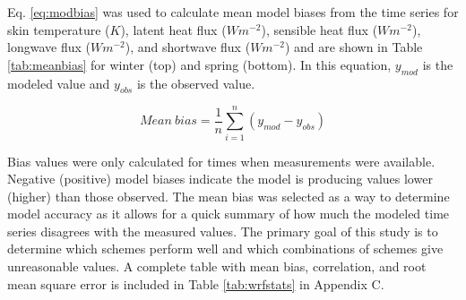 Eq. \ref{eq:modbias} was used to calculate mean model biases from the time series for skin temperature ($K$), latent heat flux ($Wm^{-2}$), sensible heat flux ($Wm^{-2}$), longwave flux ($Wm^{-2}$), and shortwave flux ($Wm^{-2}$) and are shown in Table \ref{tab:meanbias} for winter (top) and spring (bottom). In this equation, $y_{mod}$ is the modeled value and $y_{obs}$ is the observed value.
 
\begin{equation}\label{eq:modbias}
Mean~bias = \frac{1}{n}\sum^{n}_{i=1}(y_{mod} - y_{obs})
\end{equation}

 Bias values were only calculated for times when measurements were available. Negative (positive) model biases indicate the model is producing values lower (higher) than those observed. The mean bias was selected as a way to determine model accuracy as it allows for a quick summary of how much the modeled time series disagrees with the measured values. The primary goal of this study is to determine which schemes perform well and which combinations of schemes give unreasonable values. A complete table with mean bias, correlation, and root mean square error is included in Table \ref{tab:wrfstats} in Appendix C. 

